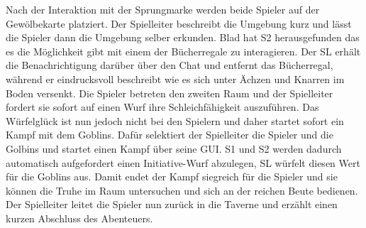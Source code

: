 Nach der Interaktion mit der Sprungmarke werden beide Spieler auf der Gewölbekarte platziert. Der Spielleiter beschreibt die Umgebung kurz und lässt die Spieler dann die Umgebung selber erkunden. Blad hat S2 herausgefunden das es die Möglichkeit gibt mit einem der Bücherregale zu interagieren. Der SL erhält die Benachrichtigung darüber über den Chat und entfernt das Bücherregal, während er eindrucksvoll beschreibt wie es sich unter Ächzen und Knarren im Boden versenkt.\newline
Die Spieler betreten den zweiten Raum und der Spielleiter fordert sie sofort auf einen Wurf ihre Schleichfähigkeit auszuführen. Das Würfelglück ist nun jedoch nicht bei den Spielern und daher startet sofort ein Kampf mit dem Goblins.\newline
Dafür selektiert der Spielleiter die Spieler und die Golbins und startet einen Kampf über seine GUI. S1 und S2 werden dadurch automatisch aufgefordert einen Initiative-Wurf abzulegen, SL würfelt diesen Wert für die Goblins aus. 
Damit endet der Kampf siegreich für die Spieler und sie können die Truhe im Raum untersuchen und sich an der reichen Beute bedienen. Der Spielleiter leitet die Spieler nun zurück in die Taverne und erzählt einen kurzen Abschluss des Abenteuers.


